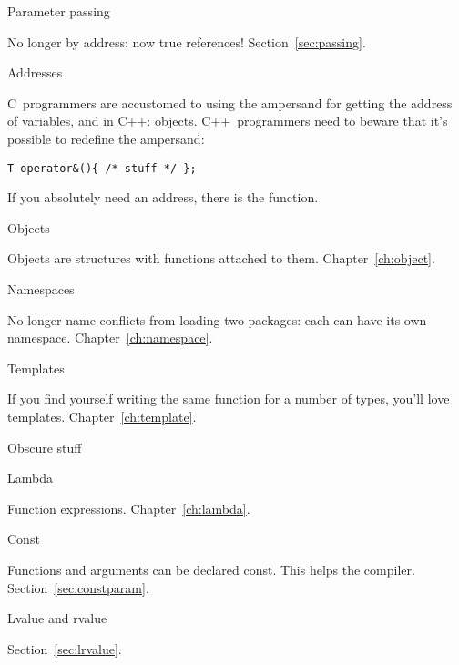  {Parameter passing}

No longer by address: now true references! Section~\ref{sec:passing}.

 {Addresses}

C~programmers are accustomed to using the ampersand for getting the address of
variables, and in C++: objects.
C++~programmers need to beware that it's possible to redefine the ampersand:
\begin{lstlisting}
T operator&(){ /* stuff */ };
\end{lstlisting}
If you absolutely need an address, there is the  function.

 {Objects}

Objects are structures with functions attached to
them. Chapter~\ref{ch:object}.

 {Namespaces}

No longer name conflicts from loading two packages: each can have its
own namespace. Chapter~\ref{ch:namespace}.

 {Templates}

If you find yourself writing the same function for a number of types,
you'll love templates. Chapter~\ref{ch:template}.

 {Obscure stuff}

 {Lambda}

Function expressions.
Chapter~\ref{ch:lambda}.

 {Const}

Functions and arguments can be declared const. This helps the
compiler. Section~\ref{sec:constparam}.

 {Lvalue and rvalue}

Section~\ref{sec:lrvalue}.

\endinput

You’ll have no destructors, so cleanup is manual. This is most fun
with early-return functions, but it can keep you entertained for all
cases. File handles, memory, and other resources (thread locks,
anyone) are all waiting patiently and silently for you to forget them.

Initialization has be be explicitly called. No constructors either.

Want inheritance? Sure. Write your own vtable (often done with function pointers in a struct).
Instead of templates, you’ll need to abandon type safety and cast back and forth to (void*). Don’t explicitly cast to (void *), because the compiler never warns about explicit or implicit casts to and from (void *).

